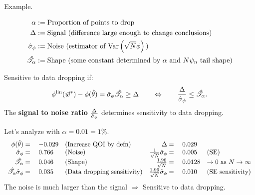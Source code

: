 
\begin{frame}[t]{Example.}

%
\begin{align*}
%
\alpha :={}& \textrm{Proportion of points to drop}\\
\Delta :={}& \textrm{Signal (difference large enough to change conclusions)}\\
\noise :={}& \textrm{Noise (estimator of }\var{}{\sqrt{N} \thetafun}\textrm{)}\\
\shape :={}& \textrm{Shape (some constant determined by }\alpha\textrm{ and } N\infl_n\textrm{ tail shape)}\\
%
\end{align*}
%

Sensitive to data dropping if:
%
\begin{align*}
%
\thetafunlin(\w^*) - \thetafun(\thetahat)  = \noise \shape \ge \Delta
\quad\quad
\Leftrightarrow
\quad\quad
\frac{\Delta}{\noise} \le \shape.
%
\end{align*}
%
The \textbf{signal to noise ratio} $\frac{\Delta}{\hat\sigma_{\phi}}$
determines sensitivity to data dropping.

\hrulefill

\vspace{-1em}
Let's analyze with $\alpha = 0.01 = 1\%$.
%
\begin{align*}
%
\begin{array}{rllrll}
\thetafun(\thetahat) ={}& -0.029  &\textrm{(Increase QOI by defn)}
    &   \Delta ={}& 0.029 \\
\noise ={}& 0.766 & \textrm{(Noise)}
        & \frac{1}{\sqrt{N}} \noise ={}& 0.005 &
        \textrm{(SE)} \\
\shape ={}& 0.046   &   \textrm{(Shape)}
    & \frac{1.96}{\sqrt{N}}  ={}& 0.0128
    & \rightarrow 0 \textrm{ as }N \rightarrow \infty\\
\shape \noise ={}& 0.035 & \textrm{(Data dropping sensitivity)}
    & \frac{1.96}{\sqrt{N}} \noise  ={}& 0.010
    & \textrm{(SE sensitivity)}\\
\end{array}
\end{align*}
%
The noise is much larger than the signal $\Rightarrow$
Sensitive to data dropping.

\end{frame}


